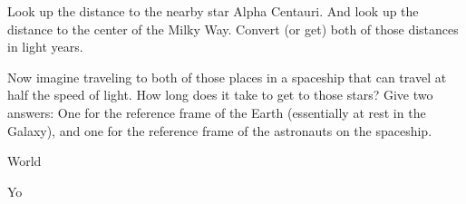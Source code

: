 \documentclass[12pt, letterpaper]{article}
\begin{document}
\begin{problem}
Look up the distance to the nearby star Alpha Centauri. And look up the
distance to the center of the Milky Way. Convert (or get) both of those
distances in light years.

Now imagine traveling to both of those places in a spaceship that can
travel at half the speed of light. How long does it take to get to
those stars? Give two answers: One for the reference frame of the
Earth (essentially at rest in the Galaxy), and one for the reference
frame of the astronauts on the spaceship.
\end{problem}

\begin{problem}
World
\end{problem}

\begin{problem}
Yo
\end{problem}
\end{document}
